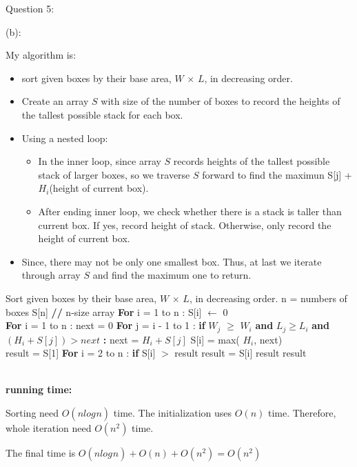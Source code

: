 \documentclass[12pt]{article}
\begin{document}
\pagebreak
\noindent
\large Question 5: \par
\large (b): \par
\normalsize 
My algorithm is:
\begin{itemize}
  \item	sort given boxes by their base area, $W$ $\times$ $L$, in decreasing order.
  \item Create an array $S$ with size of the number of boxes to record the heights of the tallest possible stack for each box.
  \item	Using a nested loop:
	\begin{itemize}
	  \item In the inner loop, since array $S$ records heights of the tallest possible stack of larger boxes, so we traverse $S$ forward to find the maximun S[j] + $H_i$(height of current box). 
	  \item After ending inner loop, we check whether there is a stack is taller than current box. If yes, record height of stack. Otherwise, only record the height of current box. 
	\end{itemize}
  \item Since, there may not be only one smallest box. Thus, at last we iterate through array $S$ and find the maximum one to return.
\end{itemize}

\begin{algorithm}
\begin{algorithmic}
\State Sort given boxes by their base area, $W$ $\times$ $L$, in decreasing order.
\State n = numbers of boxes
\State S[n] \textbf{ //} n-size array
\State \textbf{For} i = 1 to n :
\State \hspace{0.4cm} S[i] $\leftarrow$ 0  \\

\State \textbf{For} i = 1 to n :
\State \hspace{0.4cm} \textbf{}next = 0
\State \hspace{0.4cm} \textbf{For} j = i - 1 to 1 :
\State \hspace{0.8cm} \textbf{if} $W_j$ $\geq$ $W_i$ \textbf{and} $L_j \geq L_i$ \textbf{and} $(H_i+S[j]) > next$ \textbf{:}   
\State \hspace{1.2cm} next = $H_i+S[j]$
\State \hspace{0.4cm} S[i] = max( $H_i$, next)
\\
\State result = S[1]
\State \textbf{For} i = 2 to n :
\State \hspace{0.4cm} \textbf{if} S[i] $>$ result
\State \hspace{0.8cm} \textbf{} result = S[i]
\State result result
\end{algorithmic}
\end{algorithm}
\noindent \\
\textbf{running time:} \par
Sorting need $O(nlog_{}{n})$ time.
The initialization uses $O(n)$ time. 
Therefore, whole iteration need $O(n^2)$ time. \par
The final time is $O(nlog_{}{n}) + O(n) + O(n^2) = O(n^2)$
\end{document}
